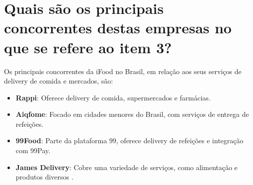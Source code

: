 \section{Quais são os principais concorrentes destas empresas no que se refere ao item 3?}

Os principais concorrentes da iFood no Brasil, em relação aos seus serviços de delivery de comida e mercados, são:

\begin{itemize}
    \item \textbf{Rappi}: Oferece delivery de comida, supermercados e farmácias.
    \item \textbf{Aiqfome}: Focado em cidades menores do Brasil, com serviços de entrega de refeições.
    \item \textbf{99Food}: Parte da plataforma 99, oferece delivery de refeições e integração com 99Pay.
    \item \textbf{James Delivery}: Cobre uma variedade de serviços, como alimentação e produtos diversos \cite{idinheiro2023}.
\end{itemize}